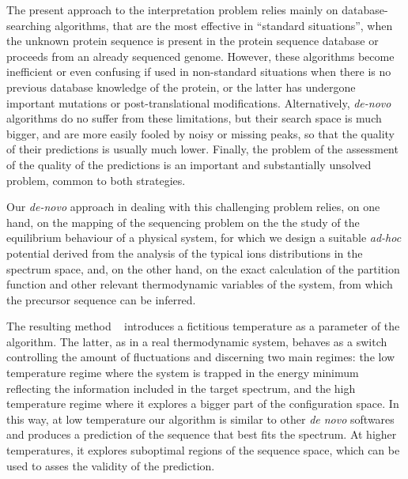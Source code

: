 The present approach to the interpretation problem relies mainly on database-searching algorithms, that are the most effective in ``standard situations'', when the unknown protein sequence is present in the protein sequence database or proceeds from an already sequenced genome. However, these algorithms  become inefficient or even confusing if used in non-standard situations when there is no previous database knowledge of the protein, or the latter has undergone important mutations or post-translational modifications. Alternatively, {\sl de-novo} algorithms do no suffer from these limitations, but their search space is much bigger, and are more easily fooled by noisy or missing peaks, so that the quality of their predictions is usually much lower. Finally, the problem of the assessment of the quality of the predictions is an important and substantially unsolved problem, common to both strategies.

Our {\sl de-novo} approach in dealing  with this challenging problem relies, on one hand, on 
the mapping of the sequencing problem on the the study of  the equilibrium behaviour of a physical
system, for which we design a suitable  \emph{ad-hoc} potential derived from the analysis of  
the typical ions distributions  in the spectrum space, and, on the other hand, on the exact
calculation of the partition function and other relevant thermodynamic variables
of the system, from which the precursor sequence can be inferred.

The  resulting method \ournovo~ introduces a fictitious temperature as a parameter
of the algorithm.
The latter, as in a real thermodynamic system, behaves as a switch
controlling the amount of
fluctuations and discerning two main regimes: the low temperature regime where
the system is trapped in the energy minimum reflecting the information included
in the target spectrum, and the high temperature regime
where it explores  a bigger part of the configuration space.
In this way, at low temperature our algorithm is similar to other \emph{de novo} 
softwares and produces a prediction of the sequence that best fits the spectrum.
At higher temperatures, it explores suboptimal regions of the sequence space, 
which can be used to asses the validity of the prediction.

